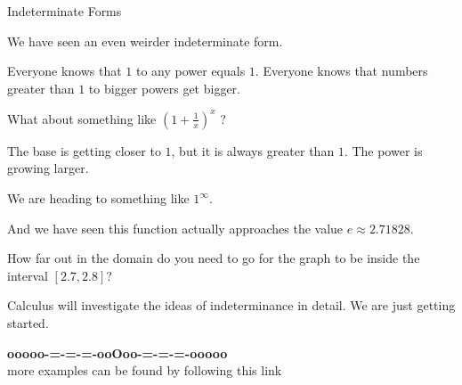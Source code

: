 \documentclass{ximera}
\begin{document}
\begin{example} Indeterminate Forms

We have seen an even weirder indeterminate form.

Everyone knows that $1$ to any power equals $1$. Everyone knows that numbers greater than $1$ to bigger powers get bigger.


What about something like $\left( 1 + \frac{1}{x} \right)^x$ ?

The base is getting closer to $1$, but it is always greater than $1$.  The power is growing larger.  

We are heading to something like $1^{\infty}$.

And we have seen this function actually approaches the value $e \approx 2.71828$. 

How far out in the domain do you need to go for the graph to be inside the interval $[2.7, 2.8]$?








\begin{center}
\end{center}









\end{example}



Calculus will investigate the ideas of indeterminance in detail.  We are just getting started.










\begin{center}
\textbf{\textcolor{green!50!black}{ooooo-=-=-=-ooOoo-=-=-=-ooooo}} \\

more examples can be found by following this link\\ 

\end{center}
\end{document}
